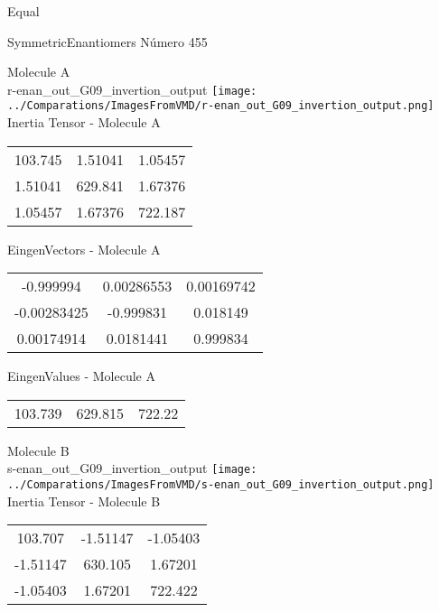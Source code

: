 \begin{center}
\vtab
\vtab
\textcolor{NavyBlue}{\Large Equal}
\end{center}

 \newpage

\vtab[-2cm]
\begin{center}
{\large SymmetricEnantiomers \tab Número 455}
\end{center}
\begin{multicols}{2}
\begin{center}

Molecule A \\ 
r-enan\_out\_G09\_invertion\_output
\texttt{[image: ../Comparations/ImagesFromVMD/r-enan\_out\_G09\_invertion\_output.png]}
\\
Inertia Tensor - Molecule A \\
\vtab

\begin{tabular}{|c c c|}
103.745	 & 	1.51041	 & 	1.05457	 \\
1.51041	 & 	629.841	 & 	1.67376	 \\
1.05457	 & 	1.67376	 & 	722.187
\end{tabular}

\vtab
 EingenVectors - Molecule A     \\
\vtab
\begin{tabular}{|c c c|}
-0.999994	 & 	0.00286553	 & 	0.00169742	 \\
-0.00283425	 & 	-0.999831	 & 	0.018149	 \\
0.00174914	 & 	0.0181441	 & 	0.999834
\end{tabular}

\vtab
 EingenValues - Molecule A     \\
\vtab
\begin{tabular}{|c c c|}
103.739	 & 	629.815	 & 	722.22	 \\
\end{tabular}
\columnbreak

Molecule B \\ 
s-enan\_out\_G09\_invertion\_output
\texttt{[image: ../Comparations/ImagesFromVMD/s-enan\_out\_G09\_invertion\_output.png]}
\\
Inertia Tensor - Molecule B \\
\vtab

\begin{tabular}{|c c c|}
103.707	 & 	-1.51147	 & 	-1.05403	 \\
-1.51147	 & 	630.105	 & 	1.67201	 \\
-1.05403	 & 	1.67201	 & 	722.422
\end{tabular}


\end{center}
\end{multicols}
